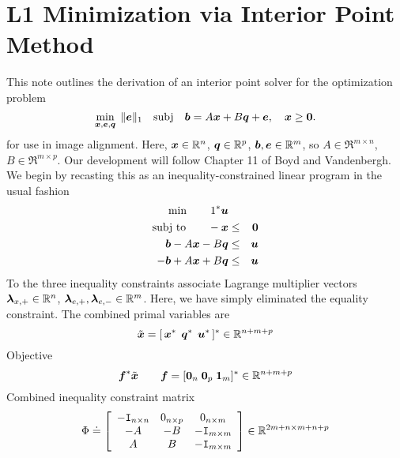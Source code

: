 \section{L1 Minimization via Interior Point Method}
\label{sec:ipm_derivation}

This note outlines the derivation of an interior point solver for the optimization problem
\begin{equation}
\min_{{\boldsymbol{x}},\boldsymbol{e},{\boldsymbol q}}\;  \| \boldsymbol{e} \|_1 \quad \mathrm{subj} \quad \boldsymbol{b} = A {\boldsymbol{x}} + B {\boldsymbol q} + \boldsymbol{e}, \quad {\boldsymbol{x}} \ge \boldsymbol{0}.
\end{equation}
for use in image alignment. Here, ${\boldsymbol{x}} \in \mathbb R^n$, ${\boldsymbol q} \in \mathbb R^p$, $\boldsymbol{b}, \boldsymbol{e} \in \mathbb R^m$, so $A \in \Re^{m \times n}$, $B \in \Re^{m\times p}$. Our development will follow Chapter 11 of Boyd and Vandenbergh. We begin by recasting this as an inequality-constrained linear program in the usual fashion
\begin{eqnarray*}
\min \qquad 1^* \boldsymbol{u} \\
\textup{subj to} \qquad -{\boldsymbol{x}} &\le& \boldsymbol{0} \\
\boldsymbol{b} - A{\boldsymbol{x}} - B{\boldsymbol q} &\le& \boldsymbol{u} \\
-\boldsymbol{b} + A {\boldsymbol{x}} + B{\boldsymbol q} &\le& \boldsymbol{u}
\end{eqnarray*}
To the three inequality constraints associate Lagrange multiplier vectors $\boldsymbol{\lambda}_{x,+} \in \mathbb R^n$, $\boldsymbol{\lambda}_{e,+}, \boldsymbol{\lambda}_{e,-} \in \mathbb R^m$. Here, we have simply eliminated the equality constraint. The combined primal variables are 
\begin{equation}
\tilde {{\boldsymbol{x}}} = [ \, {\boldsymbol{x}}^* \;\, {\boldsymbol q}^* \;\, \boldsymbol{u}^* \, ]^* \in \mathbb R^{n+m+p}
\end{equation}
Objective
\begin{equation}
\boldsymbol{f}^* \tilde {{\boldsymbol{x}}} \qquad   \boldsymbol{f} = [ \boldsymbol{0}_n \; \boldsymbol{0}_p \; {\boldsymbol{1}}_m ]^* \in \mathbb R^{n+m+p}
\end{equation}
Combined inequality constraint matrix 
\begin{equation}
\Phi \doteq \left[ \begin{array}{ccc} 
-\mathtt{I}_{n \times n} & 0_{n \times p} & 0_{n \times m} \\
-A &  -B & - \mathtt{I}_{m \times m} \\
A  &   B  &  - \mathtt{I}_{m \times m} \\
\end{array} \right] \in \mathbb R^{2m + n \times m + n + p}
\end{equation}
